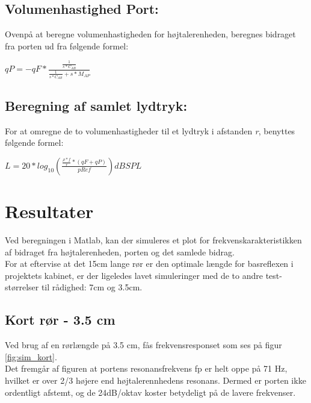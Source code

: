 \subsection{Volumenhastighed Port:}

Ovenpå at beregne volumenhastigheden for højtalerenheden, beregnes bidraget fra porten ud fra følgende formel:

{\Large\(qP=-qF*\)}{\huge \(\frac{\frac{1}{s*C_{AB}}}{\frac{1}{s*C_{AB}}+s*M_{AP}}\) }


\subsection{Beregning af samlet lydtryk:}

For at omregne de to volumenhastigheder til et lydtryk i afstanden \textit{r}, benyttes følgende formel:

\(L=20*log_{10}(\frac{\frac{\rho*f}{r}*(qF+qP)}{pRef}) dB SPL\)

\section{Resultater}

Ved beregningen i Matlab, kan der simuleres et plot for frekvenskarakteristikken af bidraget fra højtalerenheden, porten og det samlede bidrag. \\

For at eftervise at det 15cm lange rør er den optimale længde for basreflexen i projektets kabinet, er der ligeledes lavet simuleringer med de to andre test-størrelser til rådighed: 7cm og 3.5cm.\\

\subsection{Kort rør - 3.5 cm}

Ved brug af en rørlængde på 3.5 cm, fås frekvensresponset som ses på figur \ref{fig:sim_kort}. \\
Det fremgår af figuren at portens resonansfrekvens fp er helt oppe på 71 Hz, hvilket er over 2/3 højere end højtalerennhedens resonans. Dermed er porten ikke ordentligt afstemt, og de 24dB/oktav koster betydeligt på de lavere frekvenser. 

